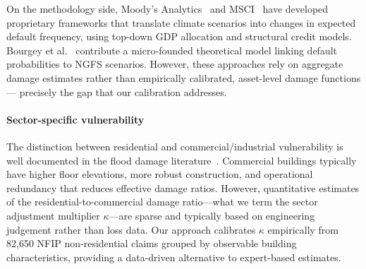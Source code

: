 On the methodology side, Moody's Analytics~\cite{bocchio2023quantifying} and MSCI~\cite{msci2024transition} have developed proprietary frameworks that translate climate scenarios into changes in expected default frequency, using top-down GDP allocation and structural credit models. Bourgey et al.~\cite{bourgey2025climacred} contribute a micro-founded theoretical model linking default probabilities to NGFS scenarios. However, these approaches rely on aggregate damage estimates rather than empirically calibrated, asset-level damage functions --- precisely the gap that our calibration addresses.

\paragraph{Sector-specific vulnerability}
The distinction between residential and commercial/industrial vulnerability is well documented in the flood damage literature~\cite{merz2010review, huizinga2017global}. Commercial buildings typically have higher floor elevations, more robust construction, and operational redundancy that reduces effective damage ratios. However, quantitative estimates of the residential-to-commercial damage ratio---what we term the sector adjustment multiplier $\kappa$---are sparse and typically based on engineering judgement rather than loss data. Our approach calibrates $\kappa$ empirically from 82{,}650 NFIP non-residential claims grouped by observable building characteristics, providing a data-driven alternative to expert-based estimates.
